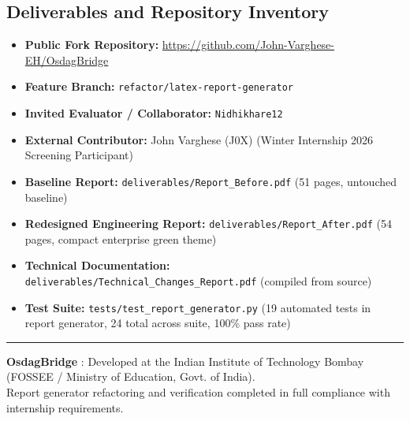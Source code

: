 \documentclass[12pt,a4paper]{article}
\begin{document}
\subsection{Deliverables and Repository Inventory}
\begin{itemize}\setlength{\itemsep}{2pt}\setlength{\parskip}{0pt}
  \item \textbf{Public Fork Repository:} \url{https://github.com/John-Varghese-EH/OsdagBridge}
  \item \textbf{Feature Branch:} \nolinkurl{refactor/latex-report-generator}
  \item \textbf{Invited Evaluator / Collaborator:} \nolinkurl{Nidhikhare12}
  \item \textbf{External Contributor:} John Varghese (J0X) (Winter Internship 2026 Screening Participant)
  \item \textbf{Baseline Report:} \nolinkurl{deliverables/Report_Before.pdf} (51 pages, untouched baseline)
  \item \textbf{Redesigned Engineering Report:} \nolinkurl{deliverables/Report_After.pdf} (54 pages, compact enterprise green theme)
  \item \textbf{Technical Documentation:} \nolinkurl{deliverables/Technical_Changes_Report.pdf} (compiled from source)
  \item \textbf{Test Suite:} \nolinkurl{tests/test_report_generator.py} (19 automated tests in report generator, 24 total across suite, 100\% pass rate)
\end{itemize}

\vspace{0.3cm}
\noindent\rule{\textwidth}{0.8pt}
\vspace{0.15cm}
\begin{center}
  \color{OsdagMuted}
  \textbf{OsdagBridge} : Developed at the Indian Institute of Technology Bombay (FOSSEE / Ministry of Education, Govt. of India).\\
  Report generator refactoring and verification completed in full compliance with internship requirements.
\end{center}
\end{document}

